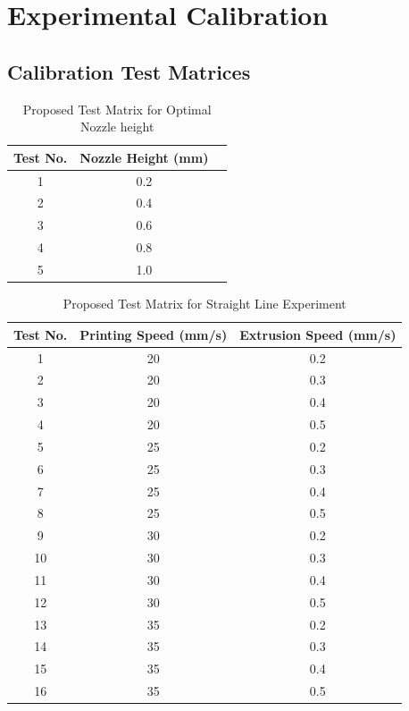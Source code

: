 \chapter{Experimental Calibration}
\section{Calibration Test Matrices}
{\small
\begin{longtable}{ccc}
\caption{Proposed Test Matrix for Optimal Nozzle height} \label{tab:heightmatrix} \\
\hline
\textbf{Test No.} & \textbf{Nozzle Height (mm)} \\
\hline
\endhead
\hline
1 & 0.2 \\
2 & 0.4 \\
3 & 0.6 \\
4 & 0.8 \\
5 & 1.0 \\
\hline
\end{longtable}
}

{\small
\begin{longtable}{ccc}
\caption{Proposed Test Matrix for Straight Line Experiment} \label{tab:linetestmatrix} \\
\hline
\textbf{Test No.} & \textbf{Printing Speed (mm/s)} & \textbf{Extrusion Speed (mm/s)} \\
\hline
1  & 20 & 0.2 \\
2  & 20 & 0.3 \\
3  & 20 & 0.4 \\
4  & 20 & 0.5 \\
5  & 25 & 0.2 \\
6  & 25 & 0.3 \\
7  & 25 & 0.4 \\
8  & 25 & 0.5 \\
9  & 30 & 0.2 \\
10 & 30 & 0.3 \\
11 & 30 & 0.4 \\
12 & 30 & 0.5 \\
13 & 35 & 0.2 \\
14 & 35 & 0.3 \\
15 & 35 & 0.4 \\
16 & 35 & 0.5 \\
\hline
\end{longtable}
}

